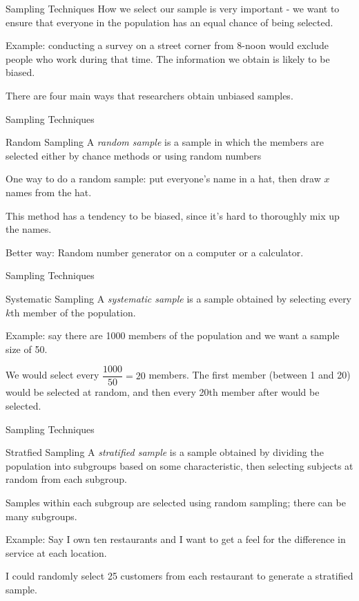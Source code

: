 \documentclass[t]{beamer}
\newcommand{\?}{\stackrel{?}{=}}
\begin{document}
	\begin{frame}{Sampling Techniques}
		How we select our sample is very important - we want to ensure that everyone in the population has an equal chance of being selected.
		
		Example: conducting a survey on a street corner from 8-noon would exclude people who work during that time. The information we obtain is likely to be biased. \pause
		
		There are four main ways that researchers obtain unbiased samples.
	\end{frame}

	\begin{frame}{Sampling Techniques}
		\begin{block}{Random Sampling}
			A \textit{random sample} is a sample in which the members are selected either by chance methods or using random numbers
		\end{block}
	
		One way to do a random sample: put everyone's name in a hat, then draw $x$ names from the hat. \pause
		
		This method has a tendency to be biased, since it's hard to thoroughly mix up the names. \pause
		
		Better way: Random number generator on a computer or a calculator.
	\end{frame}

	\begin{frame}{Sampling Techniques}
		\begin{block}{Systematic Sampling}
			A \textit{systematic sample} is a sample obtained by selecting every $k$th member of the population.
		\end{block}
	
		Example: say there are 1000 members of the population and we want a sample size of 50. \pause
		
		We would select every $\dfrac{1000}{50} = 20$ members. The first member (between 1 and 20) would be selected at random, and then every 20th member after would be selected.
	\end{frame}

	\begin{frame}{Sampling Techniques}
		\begin{block}{Stratfied Sampling}
			A \textit{stratified sample} is a sample obtained by dividing the population into subgroups based on some characteristic, then selecting subjects at random from each subgroup.
		\end{block}
	
		Samples within each subgroup are selected using random sampling; there can be many subgroups.
		
		Example: Say I own ten restaurants and I want to get a feel for the difference in service at each location. \pause
		
		I could randomly select 25 customers from each restaurant to generate a stratified sample.
	\end{frame}
\end{document}
